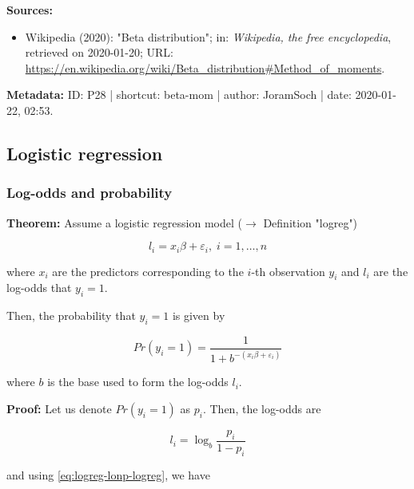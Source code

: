 \documentclass[a4paper,12pt]{book}
\begin{document}
\vspace{1em}
\textbf{Sources:}
\begin{itemize}
\item Wikipedia (2020): "Beta distribution"; in: \textit{Wikipedia, the free encyclopedia}, retrieved on 2020-01-20; URL: \url{https://en.wikipedia.org/wiki/Beta_distribution#Method_of_moments}.
\end{itemize}


\vspace{1em}
\textbf{Metadata:} ID: P28 | shortcut: beta-mom | author: JoramSoch | date: 2020-01-22, 02:53.


\subsection{Logistic regression}

\subsubsection[\textbf{Log-odds and probability}]{Log-odds and probability} \label{sec:logreg-lonp}

\vspace{1em}
\textbf{Theorem:} Assume a logistic regression model ($\rightarrow$ Definition "logreg")

\begin{equation} \label{eq:logreg-lonp-logreg}
l_i = x_i \beta + \varepsilon_i, \; i = 1,\ldots,n
\end{equation}

where $x_i$ are the predictors corresponding to the $i$-th observation $y_i$ and $l_i$ are the log-odds that $y_i = 1$.

Then, the probability that $y_i = 1$ is given by

\begin{equation} \label{eq:logreg-lonp-prob}
Pr(y_i = 1) = \frac{1}{1 + b^{-(x_i \beta + \varepsilon_i)}}
\end{equation}

where $b$ is the base used to form the log-odds $l_i$.


\vspace{1em}
\textbf{Proof:} Let us denote $Pr(y_i = 1)$ as $p_i$. Then, the log-odds are

\begin{equation} \label{eq:logreg-lonp-lodds}
l_i = \log_b \frac{p_i}{1-p_i}
\end{equation}

and using \eqref{eq:logreg-lonp-logreg}, we have
\end{document}

